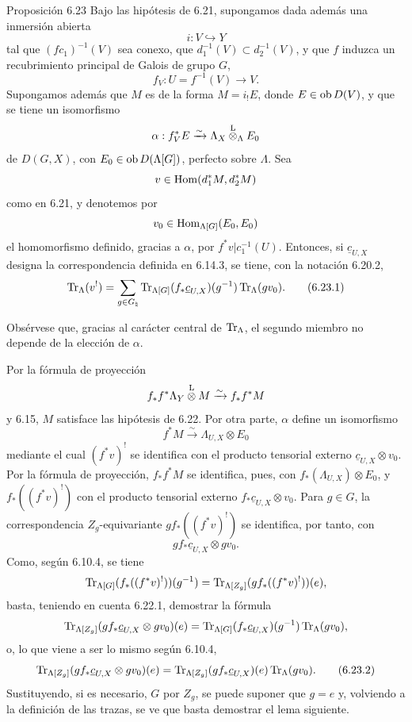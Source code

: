 \begin{statement}{Proposición 6.23}
Bajo las hipótesis de 6.21, supongamos dada además una inmersión abierta
\[
i:V\hookrightarrow Y
\]
tal que $(fc_1)^{-1}(V)$ sea conexo, que $d_1^{-1}(V)\subset d_2^{-1}(V)$, y que $f$ induzca un recubrimiento principal de Galois de grupo $G$,
\[
f_V:U=f^{-1}(V)\to V.
\]
Supongamos además que $M$ es de la forma $M=i_!E$, donde $E\in\operatorname{ob} D(V)$, y que se tiene un isomorfismo
\[
\alpha:f_V^*E\xrightarrow{\sim}\Lambda_X\overset{\mathrm L}{\otimes}_{\Lambda}E_0
\]
de $D(G,X)$, con $E_0\in\operatorname{ob} D(\Lambda[G])$, perfecto sobre $\Lambda$. Sea
\[
v\in\operatorname{Hom}(d_1^*M,d_2^*M)
\]
como en 6.21, y denotemos por
\[
v_0\in\operatorname{Hom}_{\Lambda[G]}(E_0,E_0)
\]
el homomorfismo definido, gracias a $\alpha$, por $f^*v|c_1^{-1}(U)$. Entonces, si $\underline c_{U,X}$ designa la correspondencia definida en 6.14.3, se tiene, con la notación 6.20.2,
\begin{equation}
\operatorname{Tr}_{\Lambda}(v^!)
=
\sum_{g\in G_{\natural}}
\operatorname{Tr}_{\Lambda[G]}(f_*\underline c_{U,X})(g^{-1})\operatorname{Tr}_{\Lambda}(gv_0).
\tag{6.23.1}
\end{equation}
\end{statement}

Obsérvese que, gracias al carácter central de $\operatorname{Tr}_{\Lambda}$, el segundo miembro no depende de la elección de $\alpha$.

Por la fórmula de proyección
\[
f_*f^*\Lambda_Y\overset{\mathrm L}{\otimes} M\xrightarrow{\sim}f_*f^*M
\]
y 6.15, $M$ satisface las hipótesis de 6.22. Por otra parte, $\alpha$ define un isomorfismo
\[
f^*M\xrightarrow{\sim}\Lambda_{U,X}\otimes E_0
\]
mediante el cual $(f^*v)^!$ se identifica con el producto tensorial externo $\underline c_{U,X}\otimes v_0$. Por la fórmula de proyección, $f_*f^*M$ se identifica, pues, con $f_*(\Lambda_{U,X})\otimes E_0$, y $f_*((f^*v)^!)$ con el producto tensorial externo $f_*\underline c_{U,X}\otimes v_0$. Para $g\in G$, la correspondencia $Z_g$-equivariante $gf_*((f^*v)^!)$ se identifica, por tanto, con
\[
gf_*\underline c_{U,X}\otimes gv_0.
\]
Como, según 6.10.4, se tiene
\[
\operatorname{Tr}_{\Lambda[G]}(f_*((f^*v)^!))(g^{-1})
=
\operatorname{Tr}_{\Lambda[Z_g]}(gf_*((f^*v)^!))(e),
\]
basta, teniendo en cuenta 6.22.1, demostrar la fórmula
\[
\operatorname{Tr}_{\Lambda[Z_g]}(gf_*\underline c_{U,X}\otimes gv_0)(e)
=
\operatorname{Tr}_{\Lambda[G]}(f_*\underline c_{U,X})(g^{-1})\operatorname{Tr}_{\Lambda}(gv_0),
\]
o, lo que viene a ser lo mismo según 6.10.4,
\begin{equation}
\operatorname{Tr}_{\Lambda[Z_g]}(gf_*\underline c_{U,X}\otimes gv_0)(e)
=
\operatorname{Tr}_{\Lambda[Z_g]}(gf_*\underline c_{U,X})(e)\operatorname{Tr}_{\Lambda}(gv_0).
\tag{6.23.2}
\end{equation}
Sustituyendo, si es necesario, $G$ por $Z_g$, se puede suponer que $g=e$ y, volviendo a la definición de las trazas, se ve que basta demostrar el lema siguiente.
